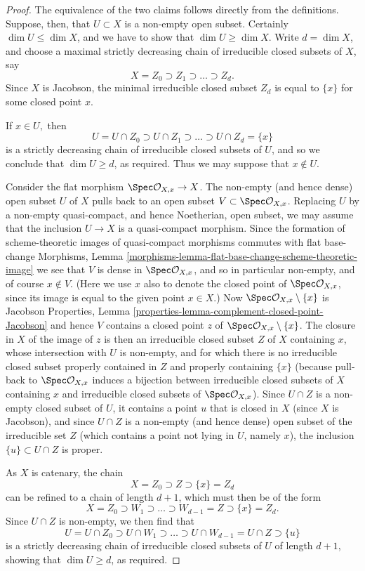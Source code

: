 \begin{proof}
The equivalence of the two claims follows directly from the
definitions.   Suppose, then, that $U\subset X$ is a non-empty open
subset.
Certainly $\dim U \leq \dim X$, and we have to show
that $\dim U \geq \dim X.$
Write $d = \dim X$, and choose a maximal strictly
decreasing chain of irreducible closed subsets
of $X$, say
$$
X = Z_0 \supset Z_1 \supset \ldots \supset Z_d.
$$
Since $X$ is Jacobson, the minimal irreducible closed
subset $Z_d$ is equal to $\{x\}$ for some closed
point $x$.

\medskip\noindent
If $x \in U,$ then
$$
U = U \cap Z_0  \supset U\cap Z_1 \supset \ldots \supset
U\cap Z_d = \{x\}
$$
is a strictly decreasing chain of irreducible closed
subsets of $U$, and so we conclude that $\dim U \geq d$,
as required.  Thus we may suppose that $x \not\in U.$

\medskip\noindent
Consider the flat morphism $\Spec \mathcal{O}_{X,x} \to X$.
The non-empty (and hence dense) open subset $U$ of $X$
pulls back to an open subset $V \subset \Spec \mathcal{O}_{X,x}$.
Replacing $U$ by a non-empty quasi-compact, and hence
Noetherian, open subset, we may assume that the inclusion
$U \to X$ is a quasi-compact morphism.  Since the
formation of scheme-theoretic images of quasi-compact
morphisms commutes with flat base-change
Morphisms, Lemma
\ref{morphisms-lemma-flat-base-change-scheme-theoretic-image}
we see that $V$ is dense in $\Spec \mathcal{O}_{X,x}$,
and so in particular non-empty,
and of course $x \not\in V.$  (Here we use $x$ also to denote
the closed point of $\Spec \mathcal{O}_{X,x}$, since its image
is equal to the given point $x \in X$.)
Now $\Spec \mathcal{O}_{X,x} \setminus \{x\}$ is Jacobson
Properties, Lemma
\ref{properties-lemma-complement-closed-point-Jacobson}
and hence $V$ contains a closed point $z$
of $\Spec \mathcal{O}_{X,x} \setminus \{x\}$.  The closure
in $X$ of the image of $z$ is then an irreducible
closed subset $Z$ of $X$ containing $x$, whose intersection
with $U$ is non-empty, and
for which there is no irreducible closed
subset properly contained in $Z$
and properly containing $\{x\}$
(because pull-back to $\Spec \mathcal{O}_{X,x}$ induces
a bijection between irreducible closed subsets of $X$
containing $x$ and irreducible closed subsets of $\Spec
\mathcal{O}_{X,x}$).
Since $U \cap Z$ is a non-empty closed subset of $U$,
it contains a point $u$ that is closed in $X$ (since
$X$ is Jacobson), and since $U\cap Z$
is a non-empty (and hence dense) open subset of the irreducible set $Z$
(which contains a point not lying in $U$, namely $x$),
the inclusion $\{u\} \subset U\cap Z$ is proper.

\medskip\noindent
As $X$ is catenary, the chain
$$
X = Z_0 \supset Z \supset \{x\} = Z_d
$$
can be refined to a chain of length $d+1$, which must then
be of the form
$$
X = Z_0 \supset W_1 \supset \ldots \supset W_{d-1} = Z \supset \{x\} = Z_d.
$$
Since $U\cap Z$ is non-empty, we then find that
$$
U = U \cap Z_0 \supset U \cap W_1\supset \ldots \supset U\cap W_{d-1}
= U\cap Z \supset \{u\}
$$
is a strictly decreasing chain of irreducible closed subsets
of $U$ of length $d+1$, showing that $\dim U \geq d$,
as required.
\end{proof}

